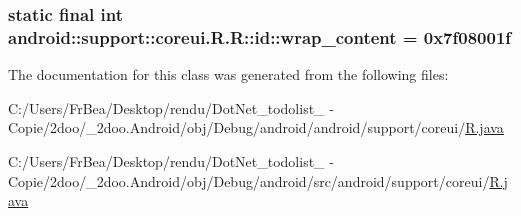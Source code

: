 \hypertarget{classandroid_1_1support_1_1coreui_1_1_r_1_1id_6f57b29a795200202805e40f02155d96}{
\subsubsection[{wrap\_\-content}]{\setlength{\rightskip}{0pt plus 5cm}static final int android::support::coreui.R.R::id::wrap\_\-content = 0x7f08001f}}
\label{classandroid_1_1support_1_1coreui_1_1_r_1_1id_6f57b29a795200202805e40f02155d96}




The documentation for this class was generated from the following files:\begin{CompactItemize}
\item 
C:/Users/FrBea/Desktop/rendu/DotNet\_\-todolist\_ - Copie/2doo/\_\-2doo.Android/obj/Debug/android/android/support/coreui/\hyperlink{android_2support_2coreui_2_r_8java}{R.java}\item 
C:/Users/FrBea/Desktop/rendu/DotNet\_\-todolist\_ - Copie/2doo/\_\-2doo.Android/obj/Debug/android/src/android/support/coreui/\hyperlink{src_2android_2support_2coreui_2_r_8java}{R.java}\end{CompactItemize}
